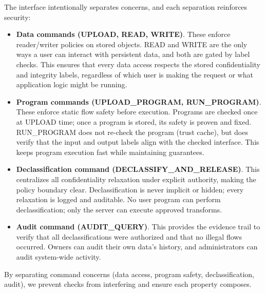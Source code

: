 The interface intentionally separates concerns, and each separation reinforces security:

\begin{itemize}
    \item \textbf{Data commands (UPLOAD, READ, WRITE)}. These enforce reader/writer policies on stored objects. READ and WRITE are the only ways a user can interact with persistent data, and both are gated by label checks. This ensures that every data access respects the stored confidentiality and integrity labels, regardless of which user is making the request or what application logic might be running.
    
    \item \textbf{Program commands (UPLOAD\_PROGRAM, RUN\_PROGRAM)}. These enforce static flow safety before execution. Programs are checked once at UPLOAD time; once a program is stored, its safety is proven and fixed. RUN\_PROGRAM does not re-check the program (trust cache), but does verify that the input and output labels align with the checked interface. This keeps program execution fast while maintaining guarantees.
    
    \item \textbf{Declassification command (DECLASSIFY\_AND\_RELEASE)}. This centralizes all confidentiality relaxation under explicit authority, making the policy boundary clear. Declassification is never implicit or hidden; every relaxation is logged and auditable. No user program can perform declassification; only the server can execute approved transforms.
    
    \item \textbf{Audit command (AUDIT\_QUERY)}. This provides the evidence trail to verify that all declassifications were authorized and that no illegal flows occurred. Owners can audit their own data's history, and administrators can audit system-wide activity.
\end{itemize}

By separating command concerns (data access, program safety, declassification, audit), we prevent checks from interfering and ensure each property composes.